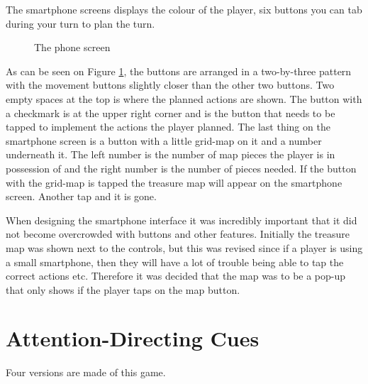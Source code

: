 The smartphone screens displays the colour of the player, six buttons you can tab during your turn to plan the turn. 

\begin{figure}
	\centering
	\caption{The phone screen}\label{fig:phone_screen}
\end{figure}

As can be seen on Figure \ref{fig:phone_screen}, the buttons are arranged in a two-by-three pattern with the movement buttons slightly closer than the other two buttons. Two empty spaces at the top is where the planned actions are shown. The button with a checkmark is at the upper right corner and is the button that needs to be tapped to implement the actions the player planned. The last thing on the smartphone screen is a button with a little grid-map on it and a number underneath it. The left number is the number of map pieces the player is in possession of and the right number is the number of pieces needed. If the button with the grid-map is tapped the treasure map will appear on the smartphone screen. Another tap and it is gone. 

When designing the smartphone interface it was incredibly important that it did not become overcrowded with buttons and other features. Initially the treasure map was shown next to the controls, but this was revised since if a player is using a small smartphone, then they will have a lot of trouble being able to tap the correct actions etc. Therefore it was decided that the map was to be a pop-up that only shows if the player taps on the map button.

\section{Attention-Directing Cues}
Four versions are made of this game.
